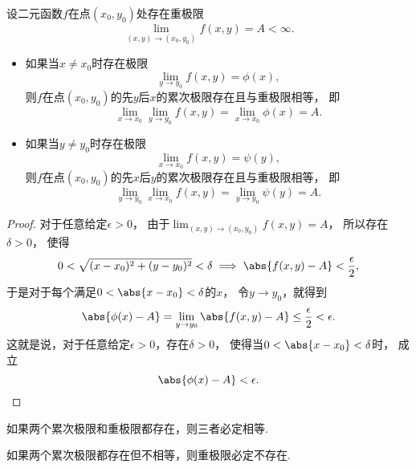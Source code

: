\begin{theorem}\label{theorem:重极限.二元函数的重极限与累次极限的关系}
设二元函数\(f\)在点\((x_0,y_0)\)处存在重极限\begin{equation*}
	\lim_{(x,y)\to(x_0,y_0)} f(x,y) = A < \infty.
\end{equation*}\begin{itemize}%
	\item 如果当\(x \neq x_0\)时存在极限\begin{equation*}
		\lim_{y \to y_0} f(x,y)
		= \phi(x),
	\end{equation*}
	则\(f\)在点\((x_0,y_0)\)的先\(y\)后\(x\)的累次极限存在且与重极限相等，
	即\begin{equation*}
		\lim_{x \to x_0} \lim_{y \to y_0} f(x,y)
		= \lim_{x \to x_0} \phi(x)
		= A.
	\end{equation*}

	\item 如果当\(y \neq y_0\)时存在极限\begin{equation*}
		\lim_{x \to x_0} f(x,y)
		= \psi(y),
	\end{equation*}
	则\(f\)在点\((x_0,y_0)\)的先\(x\)后\(y\)的累次极限存在且与重极限相等，
	即\begin{equation*}
		\lim_{y \to y_0} \lim_{x \to x_0} f(x,y)
		= \lim_{y \to y_0} \psi(y)
		= A.
	\end{equation*}
\end{itemize}
\begin{proof}
对于任意给定\(\epsilon>0\)，
由于\(\lim_{(x,y)\to(x_0,y_0)} f(x,y) = A\)，
所以存在\(\delta>0\)，
使得\begin{equation*}
	0<\sqrt{(x-x_0)^2+(y-y_0)^2}<\delta
	\implies
	\abs{f(x,y)-A}<\frac\epsilon2,
\end{equation*}
于是对于每个满足\(0<\abs{x-x_0}<\delta\)的\(x\)，
令\(y \to y_0\)，就得到\begin{equation*}
	\abs{\phi(x)-A}
	= \lim_{y \to y_0} \abs{f(x,y)-A}
	\leq \frac\epsilon2
	< \epsilon.
\end{equation*}
这就是说，对于任意给定\(\epsilon>0\)，存在\(\delta>0\)，
使得当\(0<\abs{x-x_0}<\delta\)时，
成立\begin{equation*}
	\abs{\phi(x)-A} < \epsilon.
	\qedhere
\end{equation*}
\end{proof}
\end{theorem}

\begin{corollary}
如果两个累次极限和重极限都存在，则三者必定相等.
\end{corollary}

\begin{corollary}
如果两个累次极限都存在但不相等，则重极限必定不存在.
\end{corollary}
